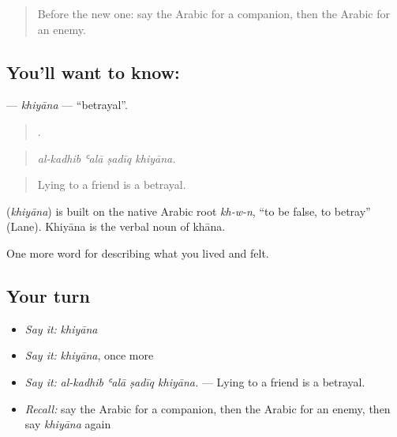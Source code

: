 \label{lesson:AR-C535-khiyana}



\begin{quote}
Before the new one: say the Arabic for a companion, then the Arabic for an enemy.
\end{quote}

\subsection*{You'll want to know: }
\textbf{} — \emph{khiyāna} — \textquotedblleft{}betrayal\textquotedblright{}.

\begin{quote}
   .
\end{quote}

\begin{quote}
\emph{al-kadhib ʿalā ṣadīq khiyāna.}
\end{quote}

\begin{quote}
Lying to a friend is a betrayal.
\end{quote}

\begin{cousinweb}
\textbf{} (\emph{khiyāna}) is built on the native Arabic root \emph{kh-w-n}, \textquotedblleft{}to be false, to betray\textquotedblright{} (Lane). Khiyāna is the verbal noun of khāna.
\end{cousinweb}

\begin{grammarlens}[title={What you've built}]
One more word for describing what you lived and felt.
\end{grammarlens}

\subsection*{Your turn}
\begin{itemize}
\raggedright
  \item \emph{Say it:} \emph{khiyāna}
  \item \emph{Say it:} \emph{khiyāna}, once more
  \item \emph{Say it:} \emph{al-kadhib ʿalā ṣadīq khiyāna.} — Lying to a friend is a betrayal.
  \item \emph{Recall:} say the Arabic for a companion, then the Arabic for an enemy, then say \emph{khiyāna} again
\end{itemize}

